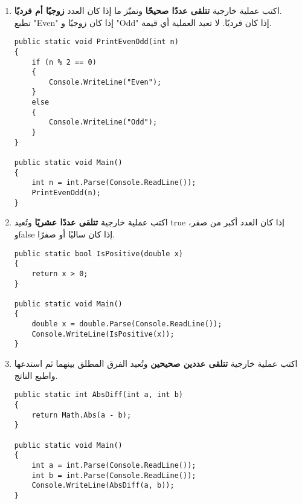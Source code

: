 ﻿\documentclass[12pt]{article}
\begin{document}
\ifwithsols
\begin{enumerate}[itemsep=3em]
\else
\begin{enumerate}
\fi

\item
اكتب عملية خارجية \textbf{تتلقى عددًا صحيحًا} وتميّز ما إذا كان العدد \textbf{زوجيًا أم فرديًا}. \\
تطبع \textenglish{"Even"} إذا كان زوجيًا و \textenglish{"Odd"} إذا كان فرديًا.
لا تعيد العملية أي قيمة.

\ifwithsols
\begin{boxSolution}
\begin{english}
\begin{verbatim}
public static void PrintEvenOdd(int n)
{
    if (n % 2 == 0)
    {
        Console.WriteLine("Even");
    }
    else
    {
        Console.WriteLine("Odd");
    }
}

public static void Main()
{
    int n = int.Parse(Console.ReadLine());
    PrintEvenOdd(n);
}
\end{verbatim}
\end{english}
\end{boxSolution}
\clearpage
\fi


\item
اكتب عملية خارجية \textbf{تتلقى عددًا عشريًا} وتُعيد \textenglish{true} إذا كان العدد أكبر من صفر،
و\textenglish{false} إذا كان سالبًا أو صفرًا.

\ifwithsols
\begin{boxSolution}
\begin{english}
\begin{verbatim}
public static bool IsPositive(double x)
{
    return x > 0;
}

public static void Main()
{
    double x = double.Parse(Console.ReadLine());
    Console.WriteLine(IsPositive(x));
}
\end{verbatim}
\end{english}
\end{boxSolution}
\fi


\item
اكتب عملية خارجية \textbf{تتلقى عددين صحيحين} وتُعيد الفرق المطلق بينهما
ثم استدعها واطبع الناتج.

\ifwithsols
\begin{boxSolution}
\begin{english}
\begin{verbatim}
public static int AbsDiff(int a, int b)
{
    return Math.Abs(a - b);
}

public static void Main()
{
    int a = int.Parse(Console.ReadLine());
    int b = int.Parse(Console.ReadLine());
    Console.WriteLine(AbsDiff(a, b));
}
\end{verbatim}
\end{english}
\end{boxSolution}
\clearpage
\fi


\end{enumerate}
\end{enumerate}
\end{document}
